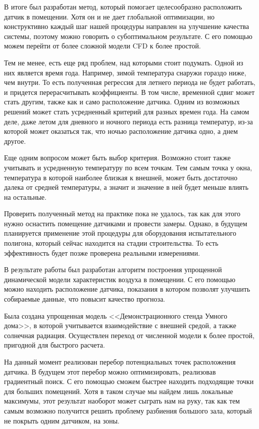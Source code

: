 
В итоге был разработан метод, который помогает целесообразно расположить датчик в помещении. Хотя он и не дает глобальной оптимизации, но конструктивно каждый шаг нашей процедуры направлен на улучшение качества системы, поэтому можно говорить о субоптимальном результате. С его помощью можем перейти от более сложной модели CFD к более простой.

Тем не менее, есть еще ряд проблем, над которыми стоит подумать. Одной из них является время года. Например, зимой температура снаружи гораздо ниже, чем внутри. То есть полученная регрессия для летнего периода не будет работать, и придется перерасчитывать коэффициенты. В том числе, временной сдвиг может стать другим, также как и само расположение датчика. Одним из возможных решений может стать усредненный критерий для разных времен года. На самом деле, даже летом для дневного и ночного периода есть разница температур, из-за которой может оказаться так, что ночью расположение датчика одно, а днем другое.

Еще одним вопросом может быть выбор критерия. Возможно стоит также учитывать и усредненную температуру по всем точкам. Тем самым точка у окна, температура в которой наиболее близкая к внешней, может быть достаточно далека от средней температуры, а значит и значение в ней будет меньше влиять на остальные.

Проверить полученный метод на практике пока не удалось, так как для этого нужно оснастить помещение датчиками и провести замеры. Однако, в будущем планируется применение этой процедуры для оборудования испытательного полигона, который сейчас находится на стадии строительства. То есть эффективность будет позже проверена реальными измерениями.

\newpage


В результате работы был разработан алгоритм построения упрощенной динамической модели характеристик воздуха в помещении. С его помощью можно находить расположение датчика, показания в котором позволят улучшить собираемые данные, что повысит качество прогноза.

Была создана упрощенная модель <<Демонстрационного стенда Умного дома>>, в которой учитывается взаимодействие с внешней средой, а также солнечная радиация. Осуществлен переход от численной модели к более простой, пригодной для быстрого расчета.

На данный момент реализован перебор потенциальных точек расположения датчика. В будущем этот перебор можно оптимизировать, реализовав градиентный поиск. С его помощью сможем быстрее находить подходящие точки для больших помещений. Хотя в таком случае мы найдем лишь локальные максимумы, этот результат наоборот может сыграть нам на руку, так как тем самым возможно получится решить проблему разбиения большого зала, который не покрыть одним датчиком, на зоны.

